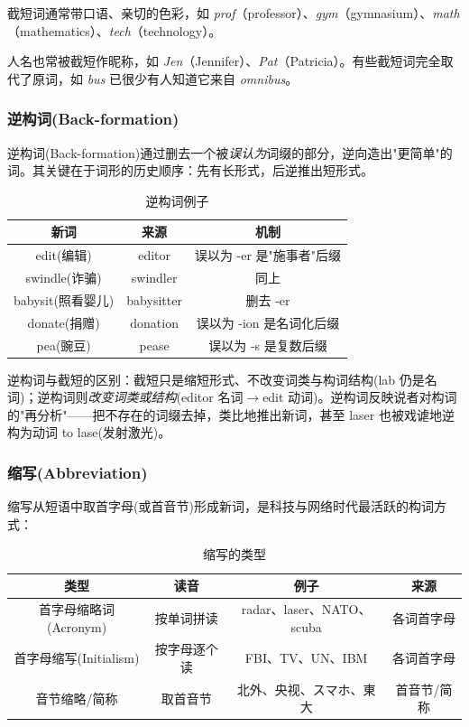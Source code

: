 截短词通常带口语、亲切的色彩，如 \emph{prof}（professor）、\emph{gym}（gymnasium）、\emph{math}（mathematics）、\emph{tech}（technology）。

人名也常被截短作昵称，如 \emph{Jen}（Jennifer）、\emph{Pat}（Patricia）。有些截短词完全取代了原词，如 \emph{bus} 已很少有人知道它来自 \emph{omnibus}。

\subsubsection{逆构词(Back-formation)}

逆构词(Back-formation)通过删去一个被\emph{误认为}词缀的部分，逆向造出"更简单"的词。其关键在于词形的历史顺序：先有长形式，后逆推出短形式。

\begin{table}[H]
\centering
\caption{逆构词例子}
\begin{tabulary}{\textwidth}{@{}CCC@{}}
\toprule
\textbf{新词} & \textbf{来源} & \textbf{机制} \\
\midrule
edit(编辑) & editor & 误以为 -er 是"施事者"后缀 \\
swindle(诈骗) & swindler & 同上 \\
babysit(照看婴儿) & babysitter & 删去 -er \\
donate(捐赠) & donation & 误以为 -ion 是名词化后缀 \\
pea(豌豆) & pease & 误以为 -s 是复数后缀 \\
\bottomrule
\end{tabulary}
\end{table}

逆构词与截短的区别：截短只是缩短形式、不改变词类与构词结构(lab 仍是名词)；逆构词则\emph{改变词类或结构}(editor 名词$\rightarrow$edit 动词)。逆构词反映说者对构词的"再分析"——把不存在的词缀去掉，类比地推出新词，甚至 laser 也被戏谑地逆构为动词 to lase(发射激光)。

\subsubsection{缩写(Abbreviation)}

缩写从短语中取首字母(或首音节)形成新词，是科技与网络时代最活跃的构词方式：

\begin{table}[H]
\centering
\caption{缩写的类型}
\begin{tabulary}{\textwidth}{@{}CCCC@{}}
\toprule
\textbf{类型} & \textbf{读音} & \textbf{例子} & \textbf{来源} \\
\midrule
首字母缩略词(Acronym) & 按单词拼读 & radar、laser、NATO、scuba & 各词首字母 \\
首字母缩写(Initialism) & 按字母逐个读 & FBI、TV、UN、IBM & 各词首字母 \\
音节缩略/简称 & 取首音节 & 北外、央视、スマホ、東大 & 首音节/简称 \\
\bottomrule
\end{tabulary}
\end{table}

